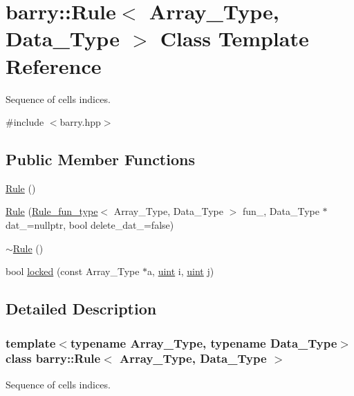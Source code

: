 \hypertarget{classbarry_1_1_rule}{}\section{barry\+:\+:Rule$<$ Array\+\_\+\+Type, Data\+\_\+\+Type $>$ Class Template Reference}
\label{classbarry_1_1_rule}


Sequence of cells indices.  




{\ttfamily \#include $<$barry.\+hpp$>$}

\subsection*{Public Member Functions}
\begin{DoxyCompactItemize}
\item 
\hyperlink{classbarry_1_1_rule_aa9d79df22874f000c8f4dd46b58cc157}{Rule} ()
\item 
\hyperlink{classbarry_1_1_rule_a2d63309b0ff8cd5d2c4827b9daf03b3a}{Rule} (\hyperlink{namespacebarry_aefd7e6d4ba228e2ce1074d075c512178}{Rule\+\_\+fun\+\_\+type}$<$ Array\+\_\+\+Type, Data\+\_\+\+Type $>$ fun\+\_\+, Data\+\_\+\+Type $\ast$dat\+\_\+=nullptr, bool delete\+\_\+dat\+\_\+=false)
\item 
\hyperlink{classbarry_1_1_rule_a5b56209f553a6fe5b841395eec8e3101}{$\sim$\+Rule} ()
\item 
bool \hyperlink{classbarry_1_1_rule_a0a9a115c6951a5c8de699d4ff9f69060}{locked} (const Array\+\_\+\+Type $\ast$a, \hyperlink{namespacebarry_a11dfc53ddb4672278319aa04f1e09a6c}{uint} i, \hyperlink{namespacebarry_a11dfc53ddb4672278319aa04f1e09a6c}{uint} j)
\end{DoxyCompactItemize}


\subsection{Detailed Description}
\subsubsection*{template$<$typename Array\+\_\+\+Type, typename Data\+\_\+\+Type$>$\newline
class barry\+::\+Rule$<$ Array\+\_\+\+Type, Data\+\_\+\+Type $>$}

Sequence of cells indices. 



